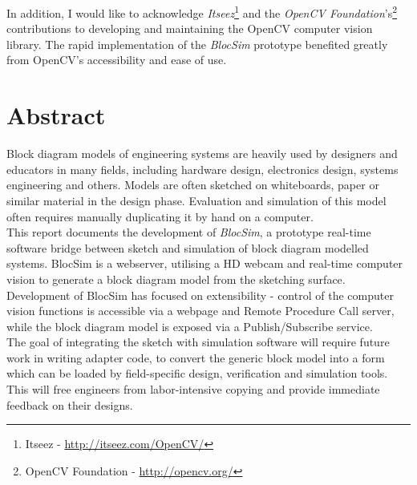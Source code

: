 In addition, I would like to acknowledge \textit{Itseez}\footnote{Itseez - \url{http://itseez.com/OpenCV/}} and the \textit{OpenCV Foundation}'s\footnote{OpenCV Foundation - \url{http://opencv.org/}} contributions to developing and maintaining the OpenCV computer vision library. The rapid implementation of the \textit{BlocSim} prototype benefited greatly from OpenCV's accessibility and ease of use.


\chapter{Abstract}

Block diagram models of engineering systems are heavily used by designers and educators in many fields, including hardware design, electronics design, systems engineering and others. Models are often sketched on whiteboards, paper or similar material in the design phase. Evaluation and simulation of this model often requires manually duplicating it by hand on a computer.
\\

This report documents the development of \textit{BlocSim}, a prototype real-time software bridge between sketch and simulation of block diagram modelled systems. BlocSim is a webserver, utilising a HD webcam and real-time computer vision to generate a block diagram model from the sketching surface. Development of BlocSim has focused on extensibility - control of the computer vision functions is accessible via a webpage and Remote Procedure Call server, while the block diagram model is exposed via a Publish/Subscribe service.
\\

The goal of integrating the sketch with simulation software will require future work in writing adapter code, to convert the generic block model into a form which can be loaded by field-specific design, verification and simulation tools. This will free engineers from labor-intensive copying and provide immediate feedback on their designs.


\begin{comment}

\end{comment}
